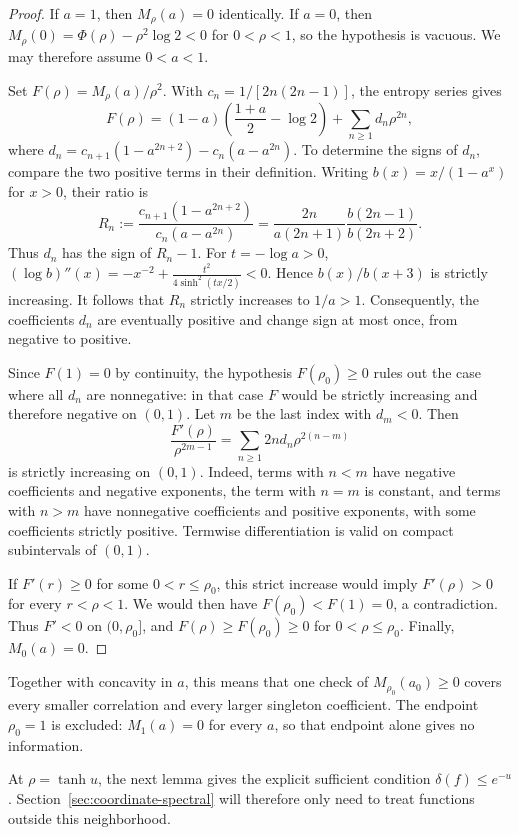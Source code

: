 \documentclass[11pt,letterpaper]{amsart}
\newcommand{\1}{\mathbf 1}
\numberwithin{equation}{section}
\begin{document}
\begin{proof}
If $a=1$, then $M_\rho(a)=0$ identically.
If $a=0$, then
$M_\rho(0)=\Phi(\rho)-\rho^2\log2<0$ for $0<\rho<1$,
so the hypothesis is vacuous.
We may therefore assume $0<a<1$.

Set $F(\rho)=M_\rho(a)/\rho^2$.
With $c_n=1/[2n(2n-1)]$, the entropy series gives
\[
 F(\rho)
=(1-a)\left(\frac{1+a}{2}-\log2\right)
   +\sum_{n\ge1}d_n\rho^{2n},
\]
where $d_n=c_{n+1}(1-a^{2n+2})-c_n(a-a^{2n})$.
To determine the signs of $d_n$, compare the two positive
terms in their definition. Writing $b(x)=x/(1-a^x)$
for $x>0$, their ratio is
\[
 R_n:=
 \frac{c_{n+1}(1-a^{2n+2})}{c_n(a-a^{2n})}
 =\frac{2n}{a(2n+1)}
   \frac{b(2n-1)}{b(2n+2)}.
\]
Thus $d_n$ has the sign of $R_n-1$.
For $t=-\log a>0$,
$(\log b)''(x)
=-x^{-2}+\frac{t^2}{4\sinh^2(tx/2)}<0$.
Hence $b(x)/b(x+3)$ is strictly increasing.
It follows that $R_n$ strictly increases to $1/a>1$.
Consequently, the coefficients $d_n$ are eventually positive
and change sign at most once, from negative to positive.

Since $F(1)=0$ by continuity, the hypothesis $F(\rho_0)\ge0$
rules out the case where all $d_n$ are nonnegative:
in that case $F$ would be strictly increasing and therefore
negative on $(0,1)$.
Let $m$ be the last index with $d_m<0$. Then
\[
 \frac{F'(\rho)}{\rho^{2m-1}}
 =\sum_{n\ge1}2n d_n\rho^{2(n-m)}
\]
is strictly increasing on $(0,1)$.
Indeed, terms with $n<m$ have negative coefficients and
negative exponents, the term with $n=m$ is constant,
and terms with $n>m$ have nonnegative coefficients and
positive exponents, with some coefficients strictly positive.
Termwise differentiation is valid on compact subintervals
of $(0,1)$.

If $F'(r)\ge0$ for some $0<r\le\rho_0$, this strict increase
would imply $F'(\rho)>0$ for every $r<\rho<1$.
We would then have $F(\rho_0)<F(1)=0$, a contradiction.
Thus $F'<0$ on $(0,\rho_0]$, and
$F(\rho)\ge F(\rho_0)\ge0$ for $0<\rho\le\rho_0$.
Finally, $M_0(a)=0$.
\end{proof}

Together with concavity in $a$, this means that one check of
$M_{\rho_0}(a_0)\ge0$ covers every smaller correlation and every
larger singleton coefficient. The endpoint $\rho_0=1$ is excluded:
$M_1(a)=0$ for every $a$, so that endpoint alone gives no information.

At $\rho=\tanh u$, the next lemma gives the explicit sufficient
condition $\delta(f)\le e^{-u}$. Section~\ref{sec:coordinate-spectral}
will therefore only need to treat functions outside this neighborhood.
\end{document}
